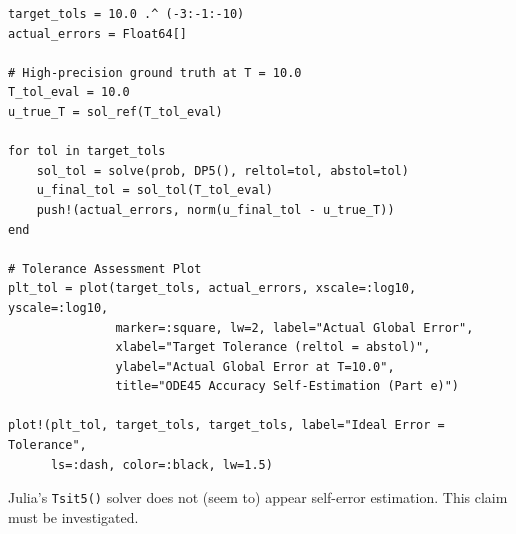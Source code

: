 \begin{verbatim}
target_tols = 10.0 .^ (-3:-1:-10)
actual_errors = Float64[]

# High-precision ground truth at T = 10.0
T_tol_eval = 10.0
u_true_T = sol_ref(T_tol_eval)

for tol in target_tols
    sol_tol = solve(prob, DP5(), reltol=tol, abstol=tol)
    u_final_tol = sol_tol(T_tol_eval)
    push!(actual_errors, norm(u_final_tol - u_true_T))
end

# Tolerance Assessment Plot
plt_tol = plot(target_tols, actual_errors, xscale=:log10, yscale=:log10,
               marker=:square, lw=2, label="Actual Global Error",
               xlabel="Target Tolerance (reltol = abstol)", 
               ylabel="Actual Global Error at T=10.0",
               title="ODE45 Accuracy Self-Estimation (Part e)")

plot!(plt_tol, target_tols, target_tols, label="Ideal Error = Tolerance", 
      ls=:dash, color=:black, lw=1.5)
\end{verbatim}

Julia's \texttt{Tsit5()} solver does not (seem to) appear self-error estimation. This claim must be investigated.